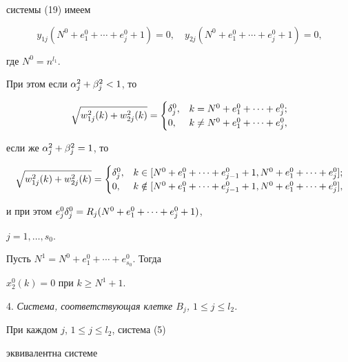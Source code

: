 системы (19) имеем


$$


y_{1j}(N^0+e_1^0+\dotsb+e_j^0+1) = 0, \quad


y_{2j}(N^0+e_1^0+\dotsb+e_j^0+1) = 0,


$$


где $N^0 = n^{l_1}$.


При этом если $\alpha_j^2 + \beta_j^2 < 1$, то


$$


\sqrt{w_{1j}^2(k)+ w_{2j}^2(k)} =


\begin{cases}


 \d_j^0, & k = N^0+e_1^0+\dotsb+e_j^0;\\


 0, & k \neq N^0+e_1^0+\dotsb+e_j^0,


\end{cases}


$$


если же $\alpha_j^2 + \beta_j^2 = 1$, то


$$


\sqrt{w_{1j}^2(k)+ w_{2j}^2(k)} =


\begin{cases}


\d_j^0,&k \in [N^0+e_1^0+\dotsb+e_{j-1}^0 +1,N^0+e_1^0+\dotsb+e_j^0];\\


0,& k \notin [N^0+e_1^0+\dotsb+e_{j-1}^0 +1, N^0+e_1^0+\dotsb+ e_j^0],


\end{cases}


$$


и при этом $e_j^0\delta_j^0 = R_j(N^0+e_1^0+\dotsb+e_j^0+1)$, 


$j =1,\dotsc,s_0$.





Пусть $N^1 = N^{0}+e_1^{0}+\dotsb+e_{s_0}^{0}$. Тогда 


$x_2^0(k) = 0 $ при $k \geq N^1+1$.


\medskip





4. {\it Система, соответствующая клетке $B_j$, $1 \leq j \leq l_2$.}


При каждом $j$, $1 \leq j \leq l_2$, система (5)


эквивалентна системе


